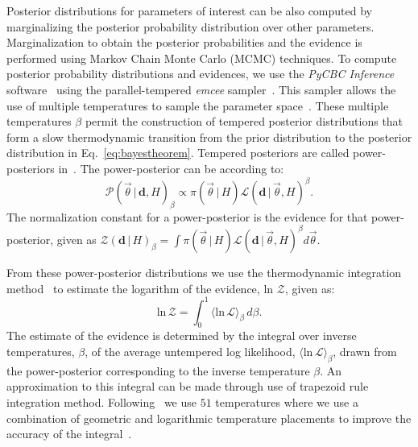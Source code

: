 Posterior distributions for parameters of interest can be also computed by marginalizing the posterior probability distribution over other parameters.  Marginalization to obtain the posterior probabilities and the evidence is performed using Markov Chain Monte Carlo (MCMC) techniques. To compute posterior probability distributions and evidences, we use the \emph{PyCBC Inference} software~\citep{alex_nitz_2018_1208115,biwer2019pycbc} using the parallel-tempered \emph{emcee} sampler~\citep{emcee,vousden:2016}.
This sampler allows the use of multiple temperatures to sample the parameter space~\citep{emcee, doi:10.1143/PTPS.157.317, B509983H}. These multiple temperatures $\beta$ permit the construction of tempered posterior distributions that form a slow thermodynamic transition from the prior distribution to the posterior distribution in Eq.~\ref{eq:bayestheorem}. Tempered posteriors are called power-posteriors in~\cite{lartillot2006computing, friel2008marginal}. The power-posterior can be according to:
\begin{equation}
    \mathcal{P}\left(\vec{\theta} \, | \,\mathbf{d}, H\right)_\beta \propto \pi\left(\vec{\theta} \, | \, H\right) \mathcal{L}\left(\mathbf{d} \, | \, \vec{\theta}, H\right)^\beta.
\end{equation}\label{eq:power_posterior}
The normalization constant for a power-posterior is the evidence for that power-posterior, given as $\mathcal{Z}(\mathbf{d} \, | \, H)_\beta = \int \pi\left(\vec{\theta} \, | \, H\right) \mathcal{L}\left(\mathbf{d} \, | \, \vec{\theta}, H\right)^\beta d\vec{\theta}$.

From these power-posterior distributions we use the thermodynamic integration method~\citep{lartillot2006computing,friel2008marginal} to estimate the logarithm of the evidence, ln $\mathcal{Z}$, given as:
\begin{equation}
\textrm{ln} \, \mathcal{Z} = \int_0^1 \langle \textrm{ln} \, \mathcal{L} \rangle_{\beta} \, d\beta.
\label{eqn:thermodyn_int}
\end{equation}
The estimate of the evidence is determined by the integral over inverse temperatures, $\beta$, of the average untempered log likelihood, $\langle \textrm{ln}\, \mathcal{L} \rangle_{\beta}$, drawn from the power-posterior corresponding to the inverse temperature $\beta$. An approximation to this integral can be made through use of trapezoid rule integration method. Following~\cite{de2018tidal} we use $51$ temperatures where we use a combination of geometric and logarithmic temperature placements to improve the accuracy of the integral~\citep{liu2016evaluating}.


